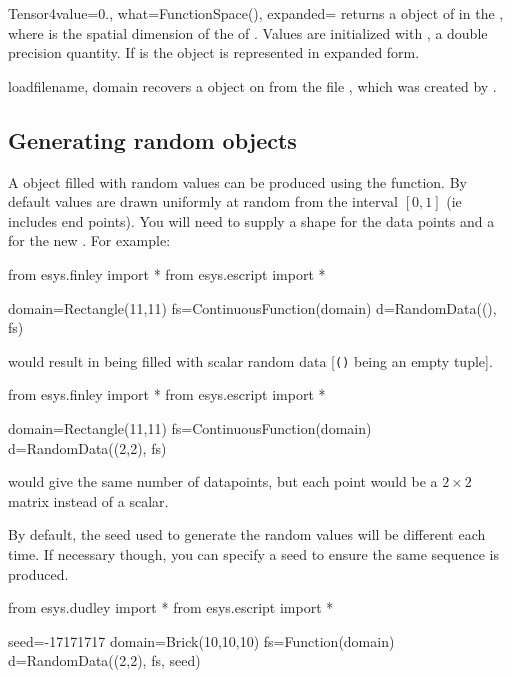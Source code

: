 \begin{funcdesc}{Tensor4}{value=0., what=FunctionSpace(), expanded=\False}
returns a \Data object of \Shape {} in the \FunctionSpace {},
where  is the spatial dimension of the \Domain of .
Values are initialized with , a double precision quantity.
If  is \True the \Data object is represented in expanded form.
\end{funcdesc}

\begin{funcdesc}{load}{filename, domain}
recovers a \Data object on \Domain {} from the file ,
which was created by .
\end{funcdesc}

\subsection{Generating random \Data objects}
A \Data object filled with random values can be produced using the 
function.
By default values are drawn uniformly at random from the interval $[0,1]$ (ie includes end points).
You will need to supply a shape for the data points and a \FunctionSpace for the new \Data.
For example:
\begin{python}
from esys.finley import *
from esys.escript import *

domain=Rectangle(11,11)
fs=ContinuousFunction(domain)
d=RandomData((), fs)
\end{python}
would result in  being filled with scalar random data [\texttt{()} being an empty tuple].

\begin{python}
from esys.finley import *
from esys.escript import *

domain=Rectangle(11,11)
fs=ContinuousFunction(domain)
d=RandomData((2,2), fs)
\end{python}
would give  the same number of datapoints, but each point would be a $2\times 2$ matrix instead of
a scalar.

By default, the seed used to generate the random values will be different each time.
If necessary though, you can specify a seed to ensure the same sequence is produced.
\begin{python}
from esys.dudley import *
from esys.escript import *

seed=-17171717
domain=Brick(10,10,10)
fs=Function(domain)
d=RandomData((2,2), fs, seed)
\end{python}

